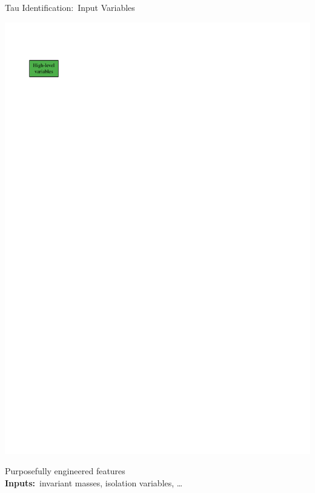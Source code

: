 \documentclass[11pt, xcolor={dvipsnames}, aspectratio=169, notes]{beamer}
\begin{document}
\begin{frame}{Tau Identification:\ Input Variables}

  \begin{minipage}[c][2.2cm][c]{0.25\textwidth}
    \centering

    \includegraphics[scale=1]{tauid/high_level_icon}
  \end{minipage}%
  \begin{minipage}[c][2.2cm][c]{0.75\textwidth}
    Purposefully engineered features\\[0.5\baselineskip]
    \textbf{Inputs:}\ invariant masses, isolation variables, \dots
  \end{minipage}%

  \pause

  \begin{minipage}[c][2.2cm][c]{0.25\textwidth}
    \centering


\end{minipage}
\end{frame}
\end{document}
